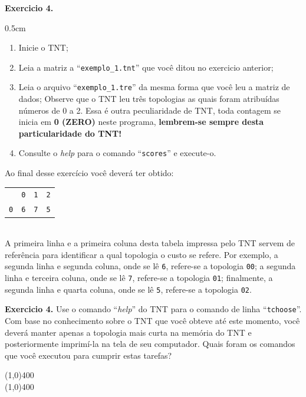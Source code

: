 \begin{refsection}
\begin{blackBlock}{\textbf{Exercicio 4.}}
\begin {myindentpar}{0.5cm}
\begin{enumerate}[\itshape a.]
	\item{Inicie o TNT};
	\item{Leia a matriz a ``\texttt{exemplo\_1.tnt}'' que você ditou no exercicio anterior};
	\item{Leia o arquivo ``\texttt{exemplo\_1.tre}'' da mesma forma que você leu a matriz de dados};
Observe que o TNT leu três topologias as quais foram atribuídas números de 0 a 2. Essa é outra peculiaridade de TNT, toda contagem se inicia em \textbf{0 (ZERO)} neste programa, \textbf{lembrem-se sempre desta particularidade do TNT!}
	\item{Consulte o \textit{help} para o comando ``\texttt{scores}'' e execute-o}.

\end{enumerate}
\end{myindentpar}

\end{blackBlock}

Ao final desse exercício você deverá ter obtido:\\

\begin{tabular}{ l c c c}
    & \texttt{0} & \texttt{1} & \texttt{2}\\
  \texttt{0} & \texttt{6} & \texttt{7} & \texttt{5}\\
\end{tabular}
\\

A primeira linha e a primeira coluna desta tabela impressa pelo TNT servem de referência para identificar a qual topologia o custo se refere. Por exemplo, a segunda linha e segunda coluna, onde se lê \texttt{6}, refere-se a topologia \texttt{00}; a segunda linha e terceira coluna, onde se lê \texttt{7}, refere-se a topologia \texttt{01}; finalmente, a segunda linha e quarta coluna, onde se lê \texttt{5}, refere-se a topologia \texttt{02}.

\begin{blackBlock}{\textbf{Exercicio 4.}}\label{tut4:ex:4.4}
	Use o comando ``\textit{help}'' do TNT para o comando de linha ``\texttt{tchoose}''. Com base no conhecimento sobre o TNT que você obteve até este momento, você deverá manter apenas a topologia mais curta na memória do TNT e posteriormente imprimí-la na tela de seu computador. Quais foram os comandos que você executou para cumprir estas tarefas?
 \begin{center}
  \line(1,0){400}\\
  \line(1,0){400}\\
 \end{center}


\end{blackBlock}
\end{refsection}
